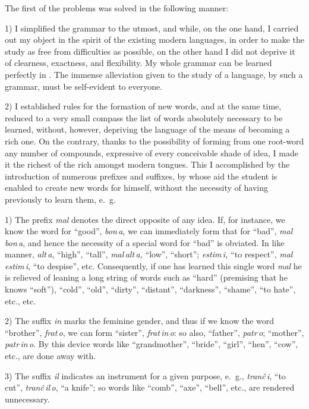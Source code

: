 
The first of the problems was solved in the following manner:

1) I simplified the grammar to the utmost, and while, on the one hand, I carried out my object in the spirit of the existing modern languages, in order to make the study as free from difficulties as possible, on the other hand I did not deprive it of clearness, exactness, and flexibility. My whole grammar can be learned perfectly in . The immense alleviation given to the study of a language, by such a grammar, must be self-evident to everyone.

2) I established rules for the formation of new words, and at the same time, reduced to a very small compass the list of words absolutely necessary to be learned, without, however, depriving the language of the means of becoming a rich one. On the contrary, thanks to the possibility of forming from one root-word any number of compounds, expressive of every conceivable shade of idea, I made it the richest of the rich amongst modern tongues. This I accomplished by the introduction of numerous prefixes and suffixes, by whose aid the student is enabled to create new words for himself, without the necessity of having previously to learn them, e.~g.

1) The prefix \emph{mal} denotes the direct opposite of any idea. If, for instance, we know the word for “good”, \emph{bon\,a}, we can immediately form that for “bad”, \emph{mal\,bon\,a}, and hence the necessity of a special word for “bad” is obviated. In like manner, \emph{alt\,a}, “high”, “tall”, \emph{mal\,alt\,a,} “low”, “short”; \emph{estim\,i,} “to respect”, \emph{mal\,estim\,i}, “to despise”, etc. Consequently, if one has learned this single word \emph{mal} he is relieved of leaning a long string of words such as “hard” (premising that he knows “soft”), “cold”, “old”, “dirty”, “distant”, “darkness”, “shame”, “to hate”, etc., etc.

2) The suffix \emph{in} marks the feminine gender, and thus if we know the word “brother”, \emph{frat\,o}, we can form “sister”, \emph{frat\,in\,o}: so also, “father”, \emph{patr\,o}; “mother”, \emph{patr\,in\,o}. By this device words like “grandmother”, “bride”, “girl”, “hen”, “cow”, etc., are done away with.

3) The suffix \emph{il} indicates an instrument for a given purpose, e.~g., \emph{tranĉ\,i}, “to cut”, \emph{tranĉ\,il\,o}, “a knife”; so words like “comb”, “axe”, “bell”, etc., are rendered unnecessary.

